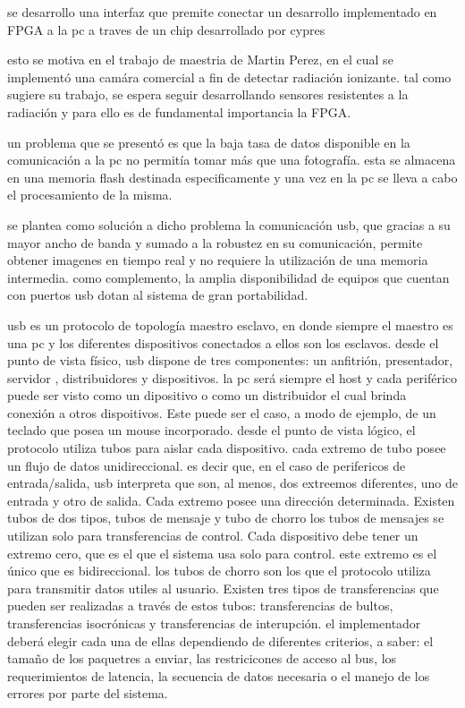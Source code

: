 se desarrollo una interfaz que premite conectar un desarrollo implementado en FPGA a la pc a traves de un chip desarrollado por cypres

esto se motiva en el trabajo de maestria de Martin Perez, en el cual se implementó una camára comercial a fin de detectar radiación ionizante. tal como sugiere su trabajo, se espera seguir desarrollando sensores resistentes a la radiación y para ello es de fundamental importancia la FPGA.

un problema que se presentó es que la baja tasa de datos disponible en la comunicación a la pc no permitía tomar más que una fotografía. esta se almacena en una memoria flash destinada especificamente y una vez en la pc se lleva a cabo el procesamiento de la misma.

se plantea como solución a dicho problema la comunicación usb, que gracias a su mayor ancho de banda y sumado a la robustez en su comunicación, permite obtener imagenes en tiempo real y no requiere la utilización de una memoria intermedia. como complemento, la amplia disponibilidad de equipos que cuentan con puertos usb dotan al sistema de gran portabilidad.

usb es un protocolo de topología maestro esclavo, en donde siempre el maestro es una pc y los diferentes dispositivos conectados a ellos son los esclavos. desde el punto de vista físico, usb dispone de tres componentes: un {anfitrión, presentador, servidor}%
, distribuidores y dispositivos. la pc será siempre el {host} y cada periférico puede ser visto como un dipositivo o como un distribuidor el cual brinda conexión a otros dispoitivos. Este puede ser el caso, a modo de ejemplo, de un teclado que posea un mouse incorporado.
desde el punto de vista lógico, el protocolo utiliza tubos para aislar cada dispositivo. cada extremo de tubo posee un flujo de datos unidireccional. es decir que, en el caso de perifericos de entrada/salida, usb interpreta que son, al menos, dos extreemos diferentes, uno de entrada y otro de salida. Cada extremo posee una dirección determinada.
Existen tubos de dos tipos, tubos de mensaje y tubo de chorro %
los tubos de mensajes se utilizan solo para transferencias de control. Cada dispositivo debe tener un extremo cero, que es el que el sistema usa solo para control. este extremo es el único que es bidireccional.
los tubos de chorro son los que el protocolo utiliza para transmitir datos utiles al usuario. Existen tres tipos de transferencias que pueden ser realizadas a través de estos tubos: transferencias de bultos, transferencias isocrónicas y transferencias de interupción. el implementador deberá elegir cada una de ellas dependiendo de diferentes criterios, a saber: el tamaño de los paquetres a enviar, las restricicones de acceso al bus, los requerimientos de latencia, la secuencia de datos necesaria o el manejo de los errores por parte del sistema.


